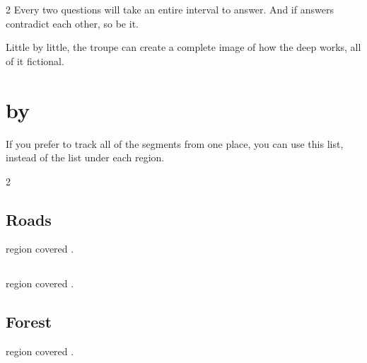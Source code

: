 \begin{multicols}{2}
Every two questions will take an entire \gls{interval} to answer.
And if answers contradict each other, so be it.

Little by little, the troupe can create a complete image of how the \gls{deep} works, all of it fictional.

\end{multicols}

\label{talismanIndex}
\printindex[talismans]

\printindex[spells]

\printindex[history]

\printindex

\needspace{0.3\paperheight}
\section{ by }

If you prefer to track all of the \glspl{segment} from one place, you can use this list, instead of the list under each \gls{region}.

\bigLine

\begin{multicols*}{2}

\raggedbottom

\subsection{Roads }

\Gls{region} covered .


\columnbreak
\subsection{ }

\Gls{region} covered .


\columnbreak
\subsection{Forest }

\Gls{region} covered .


\end{multicols*}
